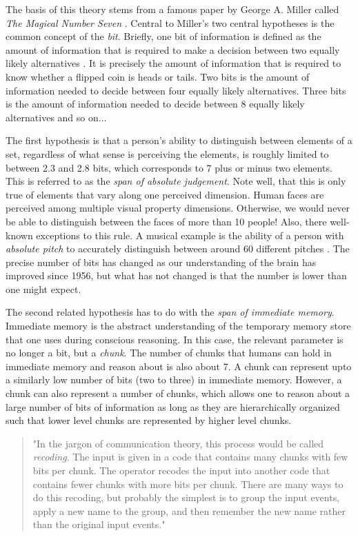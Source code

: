The basis of this theory stems from a famous paper by George A. Miller called \emph{The Magical Number Seven} \cite{seven1956}. Central to Miller's two central hypotheses is the common concept of the \emph{bit}. Briefly, one bit of information is defined as the amount of information that is required to make a decision between two equally likely alternatives \cite{seven1956}. It is precisely the amount of information that is required to know whether a flipped coin is heads or tails. Two bits is the amount of information needed to decide between four equally likely alternatives. Three bits is the amount of information needed to decide between 8 equally likely alternatives and so on...

The first hypothesis is that a person's ability to distinguish between elements of a set, regardless of what sense is perceiving the elements, is roughly limited to between 2.3 and 2.8 bits, which corresponds to 7 plus or minus two elements. This is referred to as the \emph{span of absolute judgement}. Note well, that this is only true of elements that vary along one perceived dimension. Human faces are perceived among multiple visual property dimensions. Otherwise, we would never be able to distinguish between the faces of more than 10 people! Also, there well-known exceptions to this rule. A musical example is the ability of a person with \emph{absolute pitch} to accurately distinguish between around 60 different pitches \cite{seven1956}. The precise number of bits has changed as our understanding of the brain has improved since 1956, but what has not changed is that the number is lower than one might expect. 

The second related hypothesis has to do with the \emph{span of immediate memory}. Immediate memory is the abstract understanding of the temporary memory store that one uses during conscious reasoning. In this case, the relevant parameter is no longer a bit, but a \emph{chunk}. The number of chunks that humans can hold in immediate memory and reason about is also about 7. A chunk can represent upto a similarly low number of bits (two to three) in immediate memory. However, a chunk can also represent a number of chunks, which allows one to reason about a large number of bits of information as long as they are hierarchically organized such that lower level chunks are represented by higher level chunks.

\begin{quote}
"In the jargon of communication theory, this process would be called \emph{recoding}. The input is given in a code that contains many chunks with few bits per chunk. The operator recodes the input into another code that contains fewer chunks with more bits per chunk. There are many ways to do this recoding, but probably the simplest is to group the input events, apply a new name to the group, and then remember the new name rather than the original input events." \cite{seven1956}
\end{quote}

